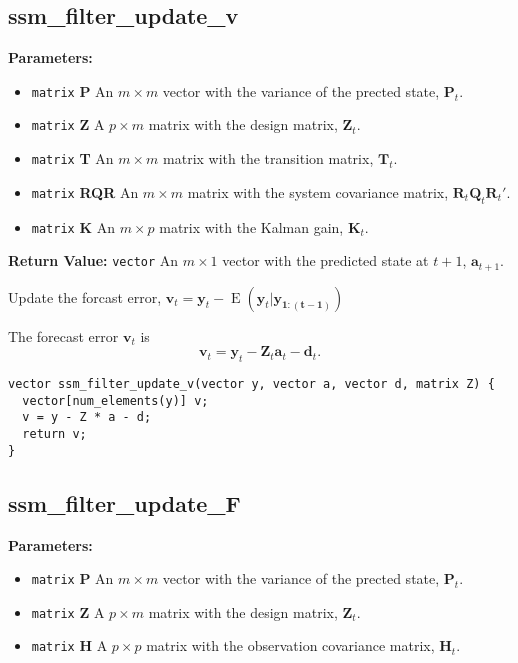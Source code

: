 \documentclass[]{book}
\providecommand{\tightlist}{%
  \setlength{\itemsep}{0pt}\setlength{\parskip}{0pt}}
\DeclareMathOperator{\E}{E}
\newcommand{\mat}[1]{\boldsymbol{#1}}
\renewcommand{\vec}[1]{\boldsymbol{#1}}
\begin{document}
\subsection{ssm\_filter\_update\_v}\label{ssmux5ffilterux5fupdateux5fv}

\textbf{Parameters:}

\begin{itemize}
\tightlist
\item
  \texttt{matrix} \textbf{P} An \(m \times m\) vector with the variance
  of the prected state, \(\mat{P}_t\).
\item
  \texttt{matrix} \textbf{Z} A \(p \times m\) matrix with the design
  matrix, \(\mat{Z}_t\).
\item
  \texttt{matrix} \textbf{T} An \(m \times m\) matrix with the
  transition matrix, \(\mat{T}_t\).
\item
  \texttt{matrix} \textbf{RQR} An \(m \times m\) matrix with the system
  covariance matrix, \(\mat{R}_t \mat{Q}_t \mat{R}_t'\).
\item
  \texttt{matrix} \textbf{K} An \(m \times p\) matrix with the Kalman
  gain, \(\mat{K}_t\).
\end{itemize}

\textbf{Return Value:} \texttt{vector} An \(m \times 1\) vector with the
predicted state at \(t + 1\), \(\vec{a}_{t + 1}\).

Update the forcast error,
\(\vec{v}_t = \vec{y}_t - \E(\vec{y}_t | \vec{y_{1:(t - 1)}})\)

The forecast error \(\vec{v}_t\) is \[
\vec{v}_t =\vec{y}_t - \mat{Z}_t \vec{a}_t - \vec{d}_t .
\]

\begin{verbatim}
vector ssm_filter_update_v(vector y, vector a, vector d, matrix Z) {
  vector[num_elements(y)] v;
  v = y - Z * a - d;
  return v;
}
\end{verbatim}

\subsection{ssm\_filter\_update\_F}\label{ssmux5ffilterux5fupdateux5ff}

\textbf{Parameters:}

\begin{itemize}
\tightlist
\item
  \texttt{matrix} \textbf{P} An \(m \times m\) vector with the variance
  of the prected state, \(\mat{P}_t\).
\item
  \texttt{matrix} \textbf{Z} A \(p \times m\) matrix with the design
  matrix, \(\mat{Z}_t\).
\item
  \texttt{matrix} \textbf{H} A \(p \times p\) matrix with the
  observation covariance matrix, \(\mat{H}_t\).
\end{itemize}
\end{document}
